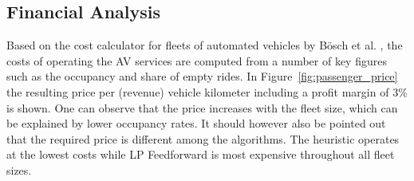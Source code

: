 \subsection{Financial Analysis}
\label{sec:cost_analysis}

Based on the cost calculator for fleets of automated vehicles by Bösch et al. \cite{Bosch2016a},
 the costs of operating the AV services are computed from a number of key figures
 such as the occupancy and share of empty rides. In Figure~\ref{fig:passenger_price}
 the resulting price per (revenue) vehicle kilometer including a profit margin of 3\% is shown. One can observe that the 
 price increases with the fleet size, which can be explained by lower occupancy rates. 
 It should however also be pointed out that the required price is different among the algorithms. 
 The heuristic operates at the lowest costs while LP Feedforward is most expensive throughout all fleet sizes.
 

\captionsetup[subfigure]{width=0.9\textwidth}

